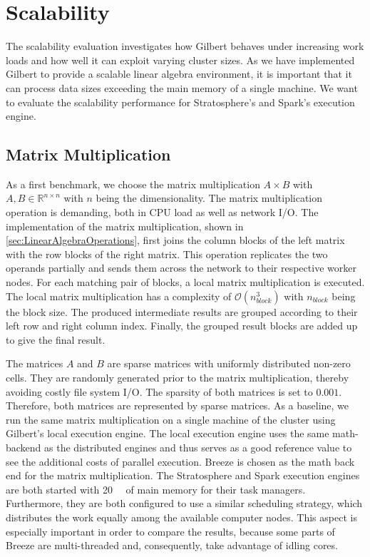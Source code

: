 \section{Scalability}

The scalability evaluation investigates how Gilbert behaves under increasing work loads and how well it can exploit varying cluster sizes.
As we have implemented Gilbert to provide a scalable linear algebra environment, it is important that it can process data sizes exceeding the main memory of a single machine.
We want to evaluate the scalability performance for Stratosphere's and Spark's execution engine.

\subsection{Matrix Multiplication}
\label{subsec:mm}

As a first benchmark, we choose the matrix multiplication $A\times B$ with $A,B \in \mathbb{R}^{n\times n}$ with $n$ being the dimensionality.
The matrix multiplication operation is demanding, both in CPU load as well as network I/O.
The implementation of the matrix multiplication, shown in \cref{sec:LinearAlgebraOperations}, first joins the column blocks of the left matrix with the row blocks of the right matrix.
This operation replicates the two operands partially and sends them across the network to their respective worker nodes.
For each matching pair of blocks, a local matrix multiplication is executed.
The local matrix multiplication has a complexity of $\mathcal{O}(n_{block}^3)$ with $n_{block}$ being the block size.
The produced intermediate results are grouped according to their left row and right column index.
Finally, the grouped result blocks are added up to give the final result.

The matrices $A$ and $B$ are sparse matrices with uniformly distributed non-zero cells.
They are randomly generated prior to the matrix multiplication, thereby avoiding costly file system I/O.
The sparsity of both matrices is set to $0.001$.
Therefore, both matrices are represented by sparse matrices.
As a baseline, we run the same matrix multiplication on a single machine of the cluster using Gilbert's local execution engine.
The local execution engine uses the same math-backend as the distributed engines and thus serves as a good reference value to see the additional costs of parallel execution.
Breeze is chosen as the math back end for the matrix multiplication.
The Stratosphere and Spark execution engines are both started with \SI{20}{\giga\byte} of main memory for their task managers.
Furthermore, they are both configured to use a similar scheduling strategy, which distributes the work equally among the available computer nodes.
This aspect is especially important in order to compare the results, because some parts of Breeze are multi-threaded and, consequently, take advantage of idling cores.

